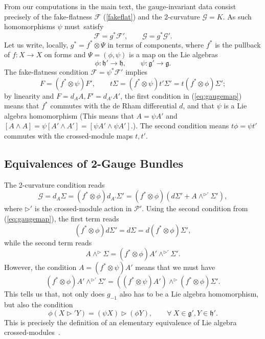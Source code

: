 \documentclass[onecolumn]{article}
\theoremstyle{theorem}
\theoremstyle{remark}
\theoremstyle{example}
\theoremstyle{definition}
\numberwithin{equation}{section}
\begin{document}
From our computations in the main text, the gauge-invariant data consist precisely of the fake-flatness $\mathcal{F}$  (\ref{fakeflat}) and the 2-curvature $\mathcal{G}=K$. As such homomorphisms $\psi$ must~satisfy
\begin{equation}
    \mathcal{F} = g^*\mathcal{F}',\qquad \mathcal{G} = g^*\mathcal{G}'.\nonumber
\end{equation}
{Let} us write, locally, $g^* = f^*\otimes \Psi$ in terms of components, where $f^*$ is the pullback of $f:X\rightarrow X$ on forms and $\Psi=(\phi,\psi)$ is a map on the Lie algebras
\begin{equation}
    \phi:\mathfrak{h}'\rightarrow \mathfrak{h},\qquad \psi:\mathfrak{g}'\rightarrow\mathfrak{g}.\nonumber
\end{equation}
{The} fake-flatness condition $\mathcal{F}=\psi^*\mathcal{F}'$ implies
\begin{equation}
    F = (f^* \otimes \psi)F',\qquad t\Sigma= (f^*\otimes \psi) t'\Sigma'= t(f^*\otimes \phi)\Sigma';\label{eq:gaugemap}
\end{equation}
by linearity and $F=d_AA,F'=d_{A'}A'$, the first condition in  (\ref{eq:gaugemap}) means that $f^*$ commutes with the de Rham differential $d$, and that $\psi$ is a Lie algebra homomorphism {(This means that $A = \psi A'$ and $[A\wedge A] = \psi[A'\wedge A'] = [\psi A'\wedge \psi A']$.)}. The second condition means $t\phi = \psi t'$ commutes with the crossed-module maps $t,t'$.

\subsection{Equivalences of 2-Gauge Bundles}
The 2-curvature condition reads
\begin{equation}
    \mathcal{G}=d_A\Sigma = (f^*\otimes \phi)d_{A'}\Sigma' = (f^*\otimes \phi)(d\Sigma' + A\wedge^{\rhd'} \Sigma'),\nonumber
\end{equation}
where $\rhd'$ is the crossed-module action in $\mathcal{P}'$. Using the second condition from  (\ref{eq:gaugemap}), the first term reads
\begin{equation}
    (f^*\otimes \phi)d\Sigma' = d\Sigma = d(f^*\otimes \phi)\Sigma',\nonumber
\end{equation}
while the second term reads
\begin{equation}
    A\wedge^\rhd \Sigma = (f^*\otimes \phi)A'\wedge^{\rhd'}\Sigma'.\nonumber  
\end{equation}
{However}, the condition $A = (f^*\otimes \psi)A'$ means that we must have
\begin{equation}
    (f^*\otimes \phi)A'\wedge^{\rhd'}\Sigma' = ((f^*\otimes \psi)A')\wedge^{\rhd} (f^*\otimes \phi)\Sigma'.\nonumber
\end{equation}
{This} tells us that, not only does $g_{-1}$ also has to be a Lie algebra homomorphism, but also the condition
\begin{equation}
    \phi(X\rhd' Y) = (\psi X)\rhd (\phi Y),\qquad \forall~ X\in\mathfrak{g}',Y\in\mathfrak{h}'.\label{eq:equiv}
\end{equation}
{This} is precisely the definition of an { {elementary equivalence}} of Lie algebra crossed-modules~\cite{Wag:2006,Baez:2005sn}.
\end{document}
